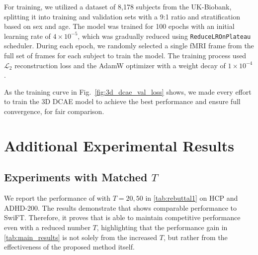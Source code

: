 For training, we utilized a dataset of 8,178 subjects from the UK-Biobank, splitting it into training and validation sets with a 9:1 ratio and stratification based on sex and age. The model was trained for 100 epochs with an initial learning rate of $4\times10^{-5}$, which was gradually reduced using \texttt{ReduceLROnPlateau} scheduler. During each epoch, we randomly selected a single fMRI frame from the full set of frames for each subject to train the model. The training process used $\mathcal{L}_2$ reconstruction loss and the AdamW optimizer with a weight decay of $1\times10^{-4}$.

As the training curve in Fig.~\ref{fig:3d_dcae_val_loss} shows, we made every effort to train the 3D DCAE model to achieve the best performance and ensure full convergence, for fair comparison.




\section{Additional Experimental Results}
\subsection{Experiments with Matched $T$}
\label{sec:matchted_t}
We report the performance of {\ours} with $T=20,50$ in \cref{tab:rebuttal1} on HCP and ADHD-200.
The results demonstrate that {\ours} shows comparable performance to SwiFT. Therefore, it proves that {\ours} is able to maintain competitive performance even with a reduced number $T$, highlighting that the performance gain in \cref{tab:main_results} is not solely from the increased $T$, but rather from the effectiveness of the proposed method itself.

